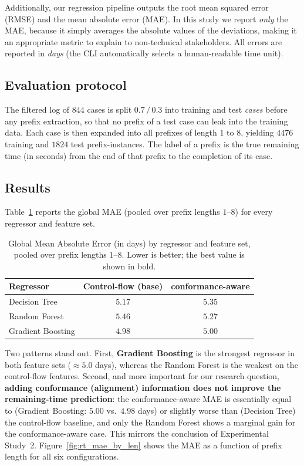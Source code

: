 \documentclass[12pt,a4paper]{article}
\begin{document}
Additionally, our regression pipeline outputs the root mean squared error (RMSE) and the mean absolute error (MAE). In this study we report \emph{only} the MAE, because it simply averages the absolute values of the deviations, making it an appropriate metric to explain to non-technical stakeholders. All errors are reported in \emph{days} (the CLI automatically selects a human-readable time unit).


\subsection{Evaluation protocol}
The filtered log of $844$ cases is split $0.7\,/\,0.3$ into training and test \emph{cases} before any prefix extraction, so that no prefix of a test case can leak into the training data. Each case is then expanded into all prefixes of length $1$ to $8$, yielding $4476$ training and $1824$ test prefix-instances. The label of a prefix is the true remaining time (in seconds) from the end of that prefix to the completion of its case.

\subsection{Results}
Table~\ref{tab:rt_mae} reports the global MAE (pooled over prefix lengths $1$--$8$) for every regressor and feature set.

\begin{table}[htbp]
	\centering
	\begin{tabular}{l c c}
		\hline
		\textbf{Regressor} & \textbf{Control-flow (base)} & \textbf{conformance-aware} \\
		\hline
		Decision Tree     & $5.17$ & $5.35$ \\
		Random Forest     & $5.46$ & $5.27$ \\
		Gradient Boosting & $\mathbf{4.98}$ & $5.00$ \\
		\hline
	\end{tabular}
	\caption{Global Mean Absolute Error (in days) by regressor and feature set, pooled over prefix lengths $1$--$8$. Lower is better; the best value is shown in bold.}
	\label{tab:rt_mae}
\end{table}

Two patterns stand out. First, \textbf{Gradient Boosting} is the strongest regressor in both feature sets ($\approx 5.0$ days), whereas the Random Forest is the weakest on the control-flow features. Second, and more important for our research question, \textbf{adding conformance (alignment) information does not improve the remaining-time prediction}: the conformance-aware MAE is essentially equal to (Gradient Boosting: $5.00$ vs.\ $4.98$ days) or slightly worse than (Decision Tree) the control-flow baseline, and only the Random Forest shows a marginal gain for the conformance-aware case. This mirrors the conclusion of Experimental Study~2.
Figure~\ref{fig:rt_mae_by_len} shows the MAE as a function of prefix length for all six configurations.
\end{document}
